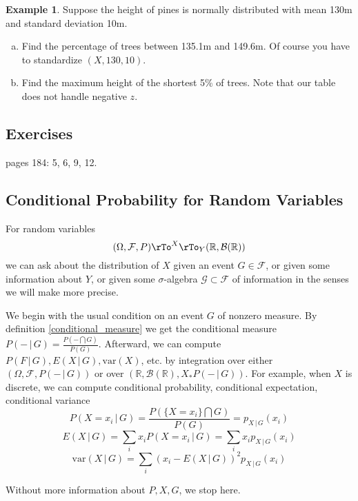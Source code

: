 \documentclass[12pt]{amsart}
\theoremstyle{definition}
\newtheorem{example}[theorem]{Example}
\begin{document}
\begin{example} Suppose the height of pines is normally distributed with mean 130m and standard deviation 10m.
\begin{enumerate}[a.]
\item Find the percentage of trees between 135.1m and 149.6m. Of course you have to standardize $(X, 130, 10)$.
\item Find the maximum height of the shortest 5\% of trees. Note that our table does not handle negative $z$.
\end{enumerate}
\end{example}

\subsection{Exercises} pages 184: 5, 6, 9, 12.

\subsection{Conditional Probability for Random Variables} \label{conditional_probability} For random variables
$$(\Omega, \mathcal{F}, P) \pile{ \rTo^X \\ \rTo_Y} (\mathbb{R}, \mathcal{B}(\mathbb{R}))$$
we can ask about the distribution of $X$ given an event $G \in \mathcal{F}$, or given some information about $Y$, or given some $\sigma$-algebra $\mathcal{G} \subset \mathcal{F}$ of information in the senses we will make more precise.

We begin with the usual condition on an event $G$ of nonzero measure. By definition \ref{conditional_measure} we get the conditional measure $P(- \,|\, G) = \frac{P(- \bigcap G)}{P(G)}$. Afterward, we can compute $P(F \,|\, G), E(X \,|\, G), \text{var}(X)$, etc. by integration over either $(\Omega, \mathcal{F}, P(- \,|\, G))$ or over $(\mathbb{R}, \mathcal{B}(\mathbb{R}), X_*P(- \,|\, G))$. For example, when $X$ is discrete, we can compute conditional probability, conditional expectation, conditional variance
$$P(X = x_i \,|\, G) = \frac{P(\{X = x_i\} \bigcap G)}{P(G)} = p_{X \,|\, G}(x_i)$$
$$E(X \,|\, G) = \sum\limits_i x_i P(X = x_i \,|\, G) = \sum\limits_i x_i p_{X \,|\, G}(x_i)$$
$$\text{var}(X \,|\, G) = \sum\limits_i (x_i - E(X \,|\, G))^2 p_{X \,|\, G}(x_i)$$

Without more information about $P, X, G$, we stop here.
\end{document}
